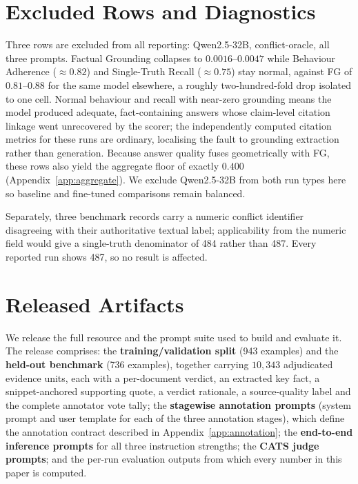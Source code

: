 \section{Excluded Rows and Diagnostics}
\label{app:artifacts}

Three rows are excluded from all reporting: Qwen2.5-32B, conflict-oracle,
all three prompts. Factual Grounding collapses to $0.0016$--$0.0047$ while
Behaviour Adherence ($\approx0.82$) and Single-Truth Recall ($\approx0.75$) stay
normal, against FG of $0.81$--$0.88$ for the same model elsewhere, a roughly
two-hundred-fold drop isolated to one cell. Normal behaviour and recall with near-zero grounding means the model produced
adequate, fact-containing answers whose claim-level citation linkage went
unrecovered by the scorer; the independently computed citation metrics for these
runs are ordinary, localising the fault to grounding extraction rather than
generation. Because answer quality fuses geometrically with FG, these rows
also yield the aggregate floor of exactly $0.400$
(Appendix~\ref{app:aggregate}). We exclude Qwen2.5-32B from both run types
here so baseline and fine-tuned comparisons remain balanced.

Separately, three benchmark records carry a numeric conflict identifier
disagreeing with their authoritative textual label; applicability from the
numeric field would give a single-truth denominator of 484 rather than 487.
Every reported run shows 487, so no result is affected.

\section{Released Artifacts}
\label{app:annprompts}

We release the full resource and the prompt suite used to build and evaluate it.
The release comprises: the \textbf{training/validation split} (943 examples) and
the \textbf{held-out benchmark} (736 examples), together carrying $10{,}343$
adjudicated evidence units, each with a per-document verdict, an extracted key
fact, a snippet-anchored supporting quote, a verdict rationale, a source-quality
label and the complete annotator vote tally; the \textbf{stagewise annotation
prompts} (system prompt and user template for each of the three annotation
stages), which define the annotation contract described in
Appendix~\ref{app:annotation}; the \textbf{end-to-end inference prompts} for all
three instruction strengths; the \textbf{CATS judge prompts}; and the per-run
evaluation outputs from which every number in this paper is computed.

